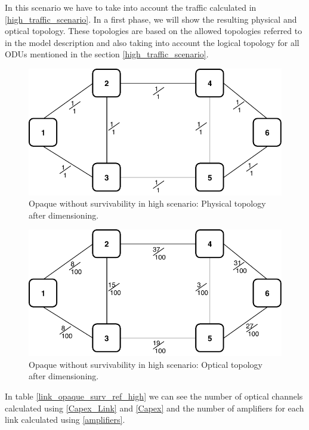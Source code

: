 In this scenario we have to take into account the traffic calculated in \ref{high_traffic_scenario}. In a first phase, we will show the resulting physical and optical topology. These topologies are based on the allowed topologies referred to in the model description and also taking into account the logical topology for all ODUs mentioned in the section \ref{high_traffic_scenario}.\\

\begin{figure}[h!]
\centering
\includegraphics[width=12cm]{sdf/ilp/opaque_survivability/figures/physical_topology}
\caption{Opaque without survivability in high scenario: Physical topology after dimensioning.}
\label{physical_high}
\end{figure}
\newpage
\begin{figure}[h!]
\centering
\includegraphics[width=12cm]{sdf/ilp/opaque_survivability/figures/optical_topology_high}
\caption{Opaque without survivability in high scenario: Optical topology after dimensioning.}
\label{optical_high}
\end{figure}

In table \ref{link_opaque_surv_ref_high} we can see the number of optical channels calculated using \ref{Capex_Link} and \ref{Capex} and the number of amplifiers for each link calculated using \ref{amplifiers}.

